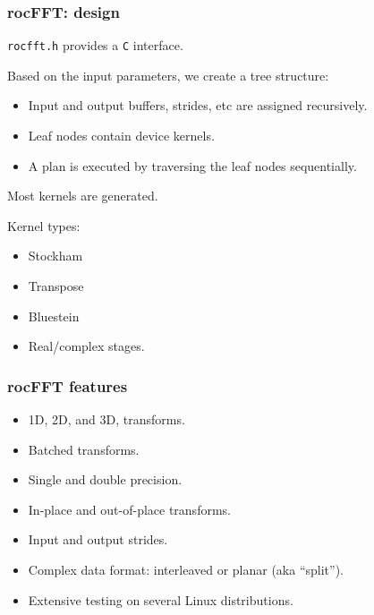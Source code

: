 \documentclass[10pt,aspectratio=169]{beamer}
\begin{document}
\begin{frame}
    \frametitle{rocFFT: design}

    \texttt{rocfft.h} provides a \texttt{C} interface.

    Based on the input parameters, we create a tree structure:
    \begin{itemize}
    \item Input and output buffers, strides, etc are assigned recursively.
    \item Leaf nodes contain device kernels.
    \item A plan is executed by traversing the leaf nodes sequentially.
    \end{itemize}

    \medskip
    
    Most kernels are generated.
    
    \medskip
    
    Kernel types:
    \begin{itemize}
    \item Stockham
    \item Transpose
    \item Bluestein
    \item Real/complex stages.
    \end{itemize}

\end{frame}

\begin{frame}
    \frametitle{rocFFT features}

    \begin{itemize}
    \item 1D, 2D, and 3D, transforms.
      \medskip
    \item Batched transforms.
      \medskip
    \item Single and double precision.
      \medskip
    \item In-place and out-of-place transforms.
      \medskip
    \item Input and output strides.
      \medskip
    \item Complex data format: interleaved or planar (aka ``split'').
      \medskip
    \item Extensive testing on several Linux distributions.
    \end{itemize}

\end{frame}
\end{document}
